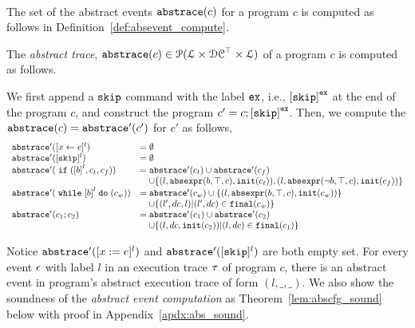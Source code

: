 \\
The set of the abstract events $\mathtt{abs}{\mathtt{trace}}(c)$ for a program $c$
is computed as follows in Definition~\ref{def:absevent_compute}.
 \begin{defn}
 \label{def:absevent_compute}
 The \emph{abstract trace}, $\mathtt{abs}{\mathtt{trace}}(c) \in \mathcal{P}( \mathcal{L} \times \mathcal{DC}^{\top} \times \mathcal{L} )$ of a program $c$  is computed as follows.

 We first append a $\mathtt{skip}$ command with 
the label $\mathtt{ex}$, i.e., $\clabel{\eskip}^{{\lex}}$ at the end of the program $c$, and construct 
the program $c' = c;\clabel{\eskip}^{{\lex}}$.
Then, we compute the $\mathtt{abs}{\mathtt{trace}}(c) = \mathtt{abs}{\mathtt{trace}}'(c')$ for $c'$ as follows,
 {
 \[
   \begin{array}{ll}
      \absflow'(\clabel{\assign{x}{\expr}}{}^l)  & = \emptyset  \\
      \absflow'([\eskip]^{l})  & = \emptyset \\
      \absflow'(\eif (\clabel{\bexpr}^l, c_t, c_f))  & =  \absflow'(c_t) \cup \absflow'(c_f)
        \\ & \quad 
        \cup \{(l, \absexpr(\bexpr, \top, c),  \absinit(c_t) ) ,  (l, \absexpr(\neg\bexpr, \top, c), \absinit(c_f)) \} \\
       \absflow'(\ewhile \clabel{\bexpr}^l \edo (c_w))  & =  \absflow'(c_w) \cup \{(l, \absexpr(\bexpr, \top, c), \absinit(c_w)) \} 
       \\ & \quad 
       \cup \{(l', dc, l)| (l', dc) \in \absfinal(c_w) \} \\
       \absflow'(c_1 ; c_2)  & = \absflow'(c_1) \cup  \absflow'(c_2) 
       \\ & \quad 
       \cup \{ (l, dc, \absinit(c_2)) | (l, dc) \in \absfinal(c_1) \} \\
   \end{array}
   \]
   }
  \end{defn}
  Notice $\mathtt{abs}{\mathtt{trace}}'([x := e]^{l})$ and $\mathtt{abs}{\mathtt{trace}}'([\mathtt{skip}]^{l})$ are both empty set. 
   For every event $\mathtt{\epsilon}$ with label $l$ in an execution trace $\mathtt{\tau}$ of program $c$, 
   there is an abstract event in program's abstract execution trace of form $(l, \_, \_)$.  
   We also show the soundness of the \emph{abstract event computation} as Theorem~\ref{lem:abscfg_sound} below with proof in Appendix~\ref{apdx:abs_sound}.
